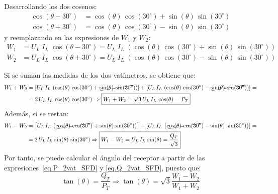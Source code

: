	Desarrollando los dos cosenos:
\begin{align*}
  \cos(\theta-{30^\circ}) &= \cos(\theta)\,\cos({30^\circ}) + \sin(\theta)\,\sin({30^\circ})\\
  \cos(\theta+{30^\circ}) &= \cos(\theta)\,\cos({30^\circ}) - \sin(\theta)\,\sin({30^\circ})
\end{align*}
y reemplazando en las expresiones de $W_1$ y $W_2$:
\begin{align*}
    W_1&=U_L\;I_L\;\cos{(\theta-30^\circ)}=U_L\;I_L\;\left( \cos(\theta)\,\cos({30^\circ}) + \sin(\theta)\,\sin({30^\circ})\right)\\
    W_2&=U_L\;I_L\;\cos{(\theta+30^\circ)}=U_L\;I_L\;\left( \cos(\theta)\,\cos({30^\circ}) - \sin(\theta)\,\sin({30^\circ})\right)
\end{align*}

Si se suman las medidas de los dos vatímetros, se obtiene que:
\begin{align}\label{eq.P_2vat_SFD}
    W_1+W_2&=\left[ U_L\,I_L\,\left( \cos(\theta)\,\cos({30^\circ}) + \cancel{\sin(\theta)\,\sin({30^\circ})}\right) \right] + [U_L\,I_L\,\left( \cos(\theta)\,\cos({30^\circ}) - \cancel{\sin(\theta)\,\sin({30^\circ})}\right) ]=\nonumber\\
    &=2\,U_L\,I_L\,\cos(\theta)\,\cos({30^\circ}) \Rightarrow \boxed{W_1 + W_2 = \sqrt{3}\,U_L\, I_L\,\cos(\theta) = P_T}
\end{align}
Además, si se restan: 
\begin{align}\label{eq.Q_2vat_SFD}
    W_1-W_2&=\left[U_L\,I_L\,\left( \cancel{\cos(\theta)\,\cos({30^\circ})} + \sin(\theta)\sin({30^\circ})\right)\right] - [U_L\,I_L\,\left( \cancel{\cos(\theta)\,\cos({30^\circ})} - \sin(\theta)\,\sin({30^\circ})\right) ]=\nonumber\\
    &=2\,U_L\,I_L\,\sin(\theta)\,\sin({30^\circ}) \Rightarrow \boxed{W_1 - W_2 = U_L\, I_L\,\sin(\theta) = \frac{Q_T}{\sqrt{3}}}
\end{align}
Por tanto, se puede calcular el ángulo del receptor a partir de las expresiones~\eqref{eq.P_2vat_SFD} y \eqref{eq.Q_2vat_SFD}, puesto que:
\begin{equation}
    \tan(\theta) = \dfrac{Q_T}{P_T}\Rightarrow \boxed{\tan(\theta) = \sqrt{3} \frac{W_1 - W_2}{W_1 + W_2}}
\end{equation}

